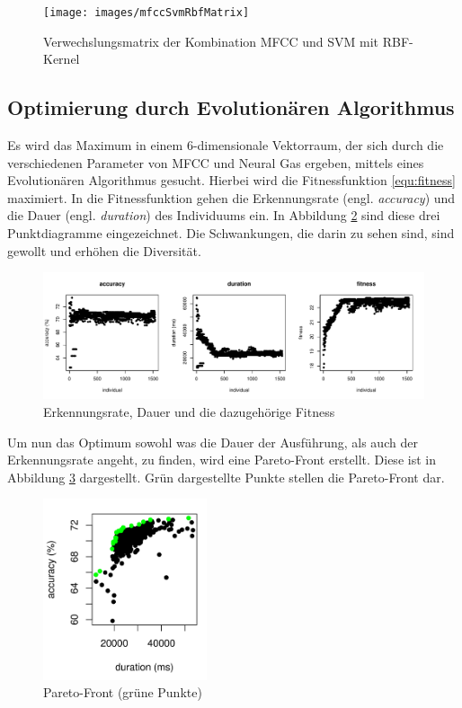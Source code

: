 \begin{figure}[h]
  \centering
  \texttt{[image: images/mfccSvmRbfMatrix]}
  \caption{Verwechslungsmatrix der Kombination MFCC und SVM mit RBF-Kernel}
  \label{fig:verwechslungsmatrixC}
\end{figure}
		
\subsection{Optimierung durch Evolutionären Algorithmus}
Es wird das Maximum in einem 6-dimensionale Vektorraum, der sich durch die verschiedenen Parameter von MFCC und Neural Gas ergeben, mittels eines Evolutionären Algorithmus gesucht. Hierbei wird die Fitnessfunktion \ref{equ:fitness} maximiert. In die Fitnessfunktion gehen die Erkennungsrate (engl. \emph{accuracy}) und die Dauer (engl. \emph{duration}) des Individuums ein. In Abbildung \ref{fig:ea1} sind diese drei Punktdiagramme eingezeichnet. Die Schwankungen, die darin zu sehen sind, sind gewollt und erhöhen die Diversität.

\begin{figure}[h]
	\centering
	\includegraphics[width=1\textwidth]{images/ea1}
	\caption{Erkennungsrate, Dauer und die dazugehörige Fitness}
	\label{fig:ea1}
\end{figure}

Um nun das Optimum sowohl was die Dauer der Ausführung, als auch der Erkennungsrate angeht, zu finden, wird eine Pareto-Front erstellt. Diese ist in Abbildung \ref{fig:ea2} dargestellt. Grün dargestellte Punkte stellen die Pareto-Front dar.

\begin{figure}[h]
	\centering
	\includegraphics[width=0.43\textwidth]{images/ea2}
	\caption{Pareto-Front (grüne Punkte)}
	\label{fig:ea2}
\end{figure}

